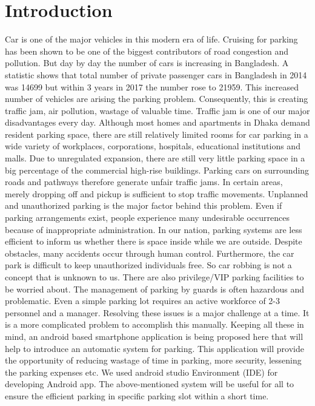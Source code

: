 \section{Introduction}
Car is one of the major vehicles in this modern era of life. Cruising for parking has been shown to be one of the biggest contributors of road congestion and pollution. But day by day the number of cars is increasing in Bangladesh. A statistic shows that total number of private passenger cars in Bangladesh in 2014 was 14699 but within 3 years in 2017 the number rose to 21959. This increased number of vehicles are arising the parking problem. Consequently, this is creating traffic jam, air pollution, wastage of valuable time. Traffic jam is one of our major disadvantages every day.
Although most homes and apartments in Dhaka demand resident parking space, there are still relatively limited rooms for car parking in a wide variety of workplaces, corporations, hospitals, educational institutions and malls. Due to unregulated expansion, there are still very little parking space in a big percentage of the commercial high-rise buildings. Parking cars on surrounding roads and pathways therefore generate unfair traffic jams. In certain areas, merely dropping off and pickup is sufficient to stop traffic movements.
Unplanned and unauthorized parking is the major factor behind this problem. Even if parking arrangements exist, people experience many undesirable occurrences because of inappropriate administration. In our nation, parking systems are less efficient to inform us whether there is space inside while we are outside. Despite obstacles, many accidents occur through human control. Furthermore, the car park is difficult to keep unauthorized individuals free. So car robbing is not a concept that is unknown to us. There are also privilege/VIP parking facilities to be worried about. The management of parking by guards is often hazardous and problematic. Even a simple parking lot requires an active workforce of 2-3 personnel and a manager.
Resolving these issues is a major challenge at a time. It is a more complicated problem to accomplish this manually. Keeping all these in mind, an android based smartphone application is being proposed here that will help to introduce an automatic system for parking. This application will provide the opportunity of reducing wastage of time in parking, more security, lessening the parking expenses etc.
We used android studio Environment (IDE) for developing Android app.
The above-mentioned system will be useful for all to ensure the efficient parking in specific parking slot within a short time.

